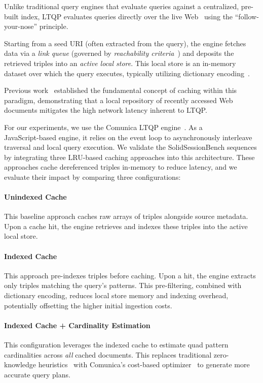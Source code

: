 Unlike traditional query engines that evaluate queries against a centralized, pre-built index, 
LTQP evaluates queries directly over the live Web~\cite{taelman2023evaluation,hartig2012sparql} 
using the ``follow-your-nose'' principle. 

Starting from a seed URI (often extracted from the query), 
the engine fetches data via a \emph{link queue} (governed by \emph{reachability criteria}~\cite{hartig2009executing}) 
and deposits the retrieved triples into an \emph{active local store}. 
This local store is an in-memory dataset over which the query executes, 
typically utilizing dictionary encoding~\cite{taelman2018comunica}. 

Previous work~\cite{hartig2011caching} established the fundamental concept of caching within this paradigm,
demonstrating that a local repository of recently accessed Web documents 
mitigates the high network latency inherent to LTQP.


For our experiments, we use the Comunica LTQP engine~\cite{taelman2018comunica,taelman2023link}. 
As a \\JavaScript-based engine, it relies on the event loop to asynchronously interleave traversal and local query execution. 
We validate the SolidSessionBench sequences by integrating three LRU-based caching approaches into this architecture.
These approaches cache dereferenced triples in-memory to reduce latency, and we evaluate their impact by comparing three configurations:


\paragraph{Unindexed Cache}
This baseline approach caches raw arrays of triples alongside source metadata. 
Upon a cache hit, the engine retrieves and indexes these triples into the active local store.

\paragraph{Indexed Cache}
This approach pre-indexes triples before caching. 
Upon a hit, the engine extracts only triples matching the query's patterns. 
This pre-filtering, combined with dictionary encoding, reduces local store memory and indexing overhead, 
potentially offsetting the higher initial ingestion costs.

\paragraph{Indexed Cache + Cardinality Estimation}
This configuration leverages the indexed cache to estimate quad pattern cardinalities 
across \emph{all} cached documents. 
This replaces traditional zero-knowledge heuristics~\cite{hartig2011zero} 
with Comunica's cost-based optimizer~\cite{taelman2018comunica} to generate more accurate query plans.

